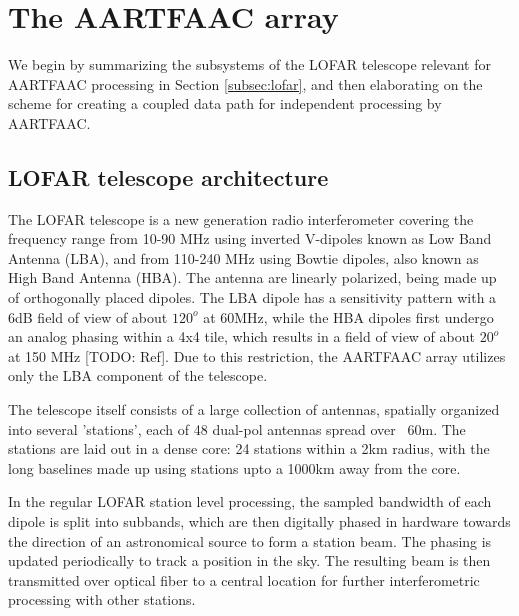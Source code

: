 \documentclass{ws-jai}
\begin{document}
\section {\label{sec:aartfaac_array}The AARTFAAC array}
We  begin by  summarizing the  subsystems of  the LOFAR  telescope relevant  for
AARTFAAC processing in  Section \ref{subsec:lofar}, and then  elaborating on the
scheme for creating a coupled data path for independent processing by AARTFAAC.

\subsection {\label{subsec:lofar} LOFAR telescope architecture}
The   LOFAR   telescope  \citep{van2013lofar}   is   a   new  generation   radio
interferometer  covering  the frequency  range  from  10-90 MHz  using  inverted
V-dipoles known  as Low Band  Antenna (LBA), and  from 110-240 MHz  using Bowtie
dipoles,  also known  as  High Band  Antenna (HBA).   The  antenna are  linearly
polarized, being made  up of orthogonally placed dipoles.  The  LBA dipole has a
sensitivity pattern with  a 6dB field of  view of about $120^o$  at 60MHz, while
the HBA dipoles first undergo an analog phasing within a 4x4 tile, which results
in  a field  of view  of  about $20^o$  at 150  MHz  [TODO: Ref].   Due to  this
restriction,  the  AARTFAAC  array  utilizes  only  the  LBA  component  of  the
telescope.

The  telescope itself  consists of  a  large collection  of antennas,  spatially
organized  into several  'stations', each  of 48  dual-pol antennas  spread over
~60m.  The  stations are  laid out  in a dense  core: 24  stations within  a 2km
radius, with the long  baselines made up using stations upto  a 1000km away from
the core. 

In the  regular LOFAR station  level processing,  the sampled bandwidth  of each
dipole  is split  into subbands,  which are  then digitally  phased in  hardware
towards the  direction of  an astronomical  source to form  a station  beam. The
phasing is  updated periodically to track  a position in the  sky. The resulting
beam is  then transmitted over optical  fiber to a central  location for further
interferometric processing with other stations.
\end{document}
